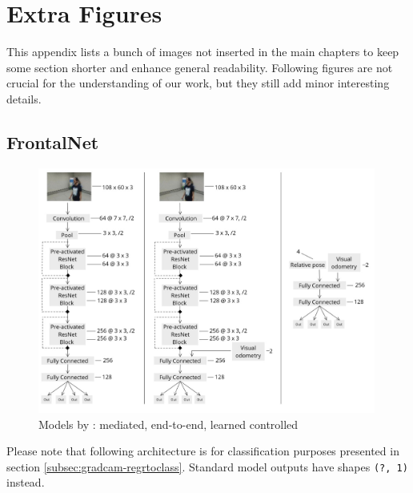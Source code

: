 
\chapter{Extra Figures}
\label{chap:extra-figures}

This appendix lists a bunch of images not inserted in the main chapters to keep some section shorter and enhance general readability. Following figures are not crucial for the understanding of our work, but they still add minor interesting details.




\section{FrontalNet}
\label{sec:extra-frontalnet}

\begin{figure}[!h]
	\centering
	\includegraphics[width=0.99\textwidth]{"contents/images/03-frontalnet-1"}
	\caption[Models by \cite{mantegazza2019visionbased}: mediated, end-to-end, learned controlled]{Models by \cite{mantegazza2019visionbased}: mediated, end-to-end, learned controlled}
	\label{fig:frontalnet-architecture-paper3approaches}
\end{figure}

Please note that following architecture is for classification purposes presented in section \ref{subsec:gradcam-regrtoclass}. Standard model outputs have shapes \texttt{(?, 1)} instead.

